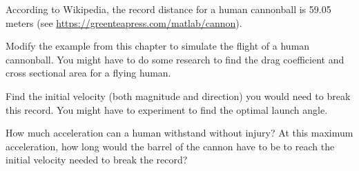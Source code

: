 According to Wikipedia, the record distance for a human cannonball is 59.05 meters (see \url{https://greenteapress.com/matlab/cannon}).

Modify the example from this chapter to simulate the flight of a human cannonball.  You might have to do some research to find the drag coefficient and cross sectional area for a flying human.

Find the initial velocity (both magnitude and direction) you would need to break this record.  You might have to experiment to find the optimal launch angle.

How much acceleration can a human withstand without injury?  At this maximum acceleration, how long would the barrel of the cannon have to be to reach the initial velocity needed to break the record?



